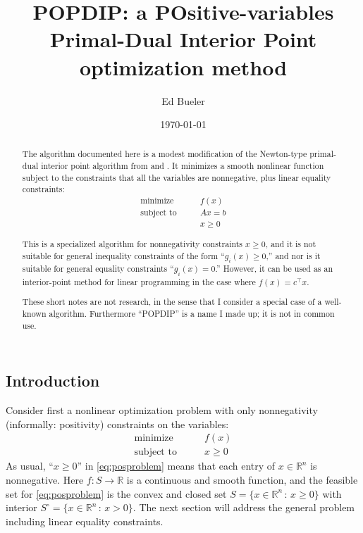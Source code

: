 \documentclass[11pt]{article}
\title{POPDIP: a POsitive-variables \\ Primal-Dual Interior Point optimization method}
\author{Ed Bueler}
\date{\today}
\newcommand{\RR}{\mathbb{R}}
\begin{document}
\maketitle

\begin{abstract}
The algorithm documented here is a modest modification of the Newton-type primal-dual interior point algorithm from \cite[Algorithm 16.1, section 16.7]{GrivaNashSofer2009} and \cite{YamashitaYabe1996}.  It minimizes a smooth nonlinear function subject to the constraints that all the variables are nonnegative, plus linear equality constraints:
\begin{equation}
\begin{matrix}
\text{minimize} \qquad   & f(x) \\
\text{subject to} \qquad & A x = b \\
                         & x \ge 0
\end{matrix} \label{eq:abstractproblem}
\end{equation}

This is a specialized algorithm for nonnegativity constraints $x\ge 0$, and it is not suitable for general inequality constraints of the form ``$g_i(x)\ge 0$,'' and nor is it suitable for general equality constraints ``$g_i(x)=0$.''  However, it can be used as an interior-point method for linear programming in the case where $f(x)=c^\top x$.

These short notes are not research, in the sense that I consider a special case of a well-known algorithm.  Furthermore ``POPDIP'' is a name I made up; it is not in common use.
\end{abstract}

\thispagestyle{empty}

\bigskip
\subsection*{Introduction}

Consider first a nonlinear optimization problem with only nonnegativity (informally: positivity) constraints on the variables:
\begin{equation}
\begin{matrix}
\text{minimize} \qquad & f(x) \\
\text{subject to} \qquad & x \ge 0
\end{matrix} \label{eq:posproblem}
\end{equation}
As usual, ``$x\ge 0$'' in \eqref{eq:posproblem} means that each entry of $x\in\RR^n$ is nonnegative.  Here $f:S \to \RR$ is a continuous and smooth function, and the feasible set for \eqref{eq:posproblem} is the convex and closed set $S = \{x\in \RR^n\,:\,x\ge 0\}$ with interior $S^\circ = \{x\in \RR^n\,:\,x > 0\}$.  The next section will address the general problem including linear equality constraints.
\end{document}
